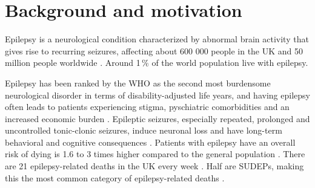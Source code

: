 \section{Background and motivation}

Epilepsy is a neurological condition characterized by abnormal brain activity that gives rise to recurring seizures, affecting about 600 000 people in the UK and 50 million people worldwide \cite{nice_epilepsies_2012,fiest_prevalence_2017}.
Around 1\,\% of the world population live with epilepsy.

Epilepsy has been ranked by the \ac{WHO} as the second most burdensome neurological disorder in terms of disability-adjusted life years, and
having epilepsy often leads to patients experiencing stigma, pyschiatric comorbidities and an increased economic burden \cite{fiest_prevalence_2017}.
Epileptic seizures, especially repeated, prolonged and uncontrolled tonic-clonic seizures, induce neuronal loss and have long-term behavioral and cognitive consequences \cite{sutula_epileptic_2003}.
Patients with epilepsy have an overall risk of dying is 1.6 to 3 times higher compared to the general population \cite{forsgren_mortality_2005}.
There are 21 epilepsy-related deaths in the UK every week%
.
Half are \acp{SUDEP},  %
making this the most common category of epilepsy-related deaths \cite{devinsky_sudden_2016}.





